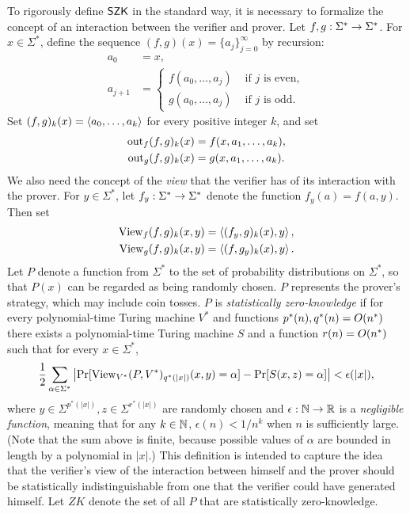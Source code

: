   To rigorously define $\mathsf{SZK}$ in the standard way, it is necessary to formalize the concept of an
  interaction between the verifier and prover. Let
  $f,g:\Sigma^*\rightarrow\Sigma^*$. For $x\in\Sigma^*$, define the sequence
  $(f,g)(x)=\{a_j\}_{j=0}^\infty$ by recursion:
  \begin{align*}
  a_0&=x, \\
  a_{j+1}&=\begin{cases}f(a_0,\ldots,a_j)&\text{ if }j\text{ is even}, \\
  g(a_0,\ldots,a_j)&\text{ if }j\text{ is odd}.\end{cases}
  \end{align*}
  Set $(f,g)_k(x)=\left\langle a_0,\ldots,a_k\right\rangle$ for every positive integer $k$, and
  set
  \begin{align*}
  \operatorname{out}_f(f,g)_k(x)&=f(x,a_1,\ldots,a_k), \\
  \operatorname{out}_g(f,g)_k(x)&=g(x,a_1,\ldots,a_k).
  \end{align*}
  We also need the concept of the \textit{view} that the verifier has of its
  interaction with the prover. For $y\in\Sigma^*$, let $f_y:\Sigma^*\rightarrow\Sigma^*$
  denote the function $f_y(a)=f(a,y)$. Then set
  \begin{align*}
  \operatorname{View}_f(f,g)_k(x,y)&=\left\langle(f_y,g)_k(x),y\right\rangle, \\
  \operatorname{View}_g(f,g)_k(x,y)&=\left\langle(f,g_y)_k(x),y\right\rangle.
  \end{align*}
  Let $P$ denote a function from $\Sigma^*$ to the set of probability 
  distributions on $\Sigma^*$, so that $P(x)$ can be regarded as being randomly 
  chosen. $P$ represents the prover's strategy, which may include coin tosses.
  $P$ is \textit{statistically zero-knowledge} if for every polynomial-time 
  Turing machine $V^*$ and functions $p^*(n),q^*(n)=O(n^*)$ there exists a 
  polynomial-time Turing machine $S$ and a function $r(n)=O(n^*)$ such that for 
  every $x\in\Sigma^*$,
  \[
  \frac{1}{2}\sum_{\alpha\in\Sigma^*}
  \left|\Pr[\operatorname{View}_{V^*}(P,V^*)_{q^*(|x|)}(x,y)=\alpha]
  -\Pr[S(x,z)=\alpha]\right|<\epsilon(|x|),
  \]
  where $y\in\Sigma^{p^*(|x|)},z\in\Sigma^{r^*(|x|)}$ are randomly chosen and 
  $\epsilon:\mathbb{N}\rightarrow\mathbb{R}$ is a \textit{negligible function}, meaning that for any 
  $k\in\mathbb{N}$, $\epsilon(n)<1/n^k$ when $n$ is sufficiently large. (Note that the 
  sum above is finite, because possible values of $\alpha$ are bounded in length 
  by a polynomial in $|x|$.) This definition is intended to capture the idea that
  the verifier's view of the interaction between himself and the prover should be
  statistically indistinguishable from one that the verifier could have generated
  himself. Let $ZK$ denote the set of all $P$ that are statistically  
  zero-knowledge.

